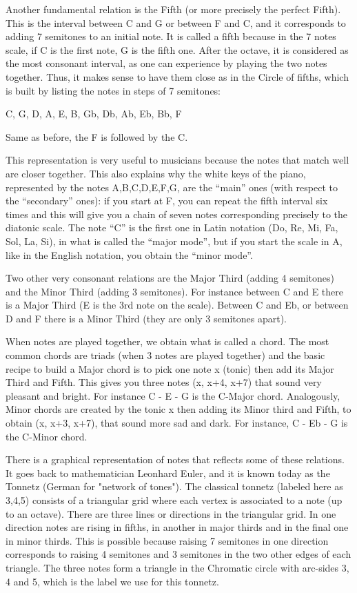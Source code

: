 Another fundamental relation is the Fifth (or more precisely the perfect Fifth). This is the interval between C and G or between F and C, and it corresponds to adding 7 semitones to an initial note. It is called a fifth because in the 7 notes scale, if C is the first note, G is the fifth one. After the octave, it is considered as the most consonant interval, as one can experience by playing the two notes together. Thus, it makes sense to have them close as in the Circle of fifths, which is built by listing the notes in steps of 7 semitones: 

C, G, D, A, E, B, Gb, Db, Ab, Eb, Bb, F

Same as before, the F is followed by the C.

This representation is very useful to musicians because the notes that match well are closer together. This also explains why the white keys of the piano, represented by the  notes A,B,C,D,E,F,G, are the ``main'' ones (with respect to the ``secondary'' ones): if you start at F, you can repeat the fifth interval six times and this will give you a chain of seven notes corresponding precisely to the diatonic scale. The note ``C'' is the first one in Latin notation (Do, Re, Mi, Fa, Sol, La, Si), in what is called the ``major mode'', but if you start the scale in A, like in the English notation, you obtain the ``minor mode''.

Two other very consonant relations are the Major Third (adding 4 semitones) and the Minor Third (adding 3 semitones). For instance between C and E there is a Major Third (E is the 3rd note on the scale). Between C and Eb, or between D and F there is a Minor Third (they are only 3 semitones apart).

When notes are played together, we obtain what is called a chord. The most common chords are triads (when 3 notes are played together) and the basic recipe to build a Major chord is to pick one note x (tonic) then add its Major Third and Fifth. This gives you three notes (x, x+4, x+7) that sound very pleasant and bright. For instance C - E - G is the C-Major chord. Analogously, Minor chords are created by the tonic x then adding its Minor third and Fifth, to obtain (x, x+3, x+7), that sound more sad and dark. For instance, C - Eb - G is the C-Minor chord.

There is a graphical representation of notes that reflects some of these relations. It goes back to mathematician Leonhard Euler, and it is known today as the Tonnetz (German for "network of tones"). The classical tonnetz (labeled here as 3,4,5) consists of a triangular grid where each vertex is associated to a note (up to an octave). There are three lines or directions in the triangular grid. In one direction notes are rising in fifths, in another in major thirds and in the final one in minor thirds. This is possible because raising 7 semitones in one direction corresponds to raising 4 semitones and 3 semitones in the two other edges of each triangle. The three notes form a triangle in the Chromatic circle with arc-sides 3, 4 and 5, which is the label we use for this tonnetz.


